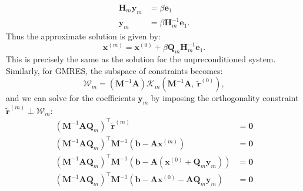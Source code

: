\documentclass{article}
\begin{document}
\begin{appendix}
\begin{align*}
        \symbf{H}_m \symbf{y}_m                                                                                                                                        & = \beta \symbf{e}_1                   \\
        \symbf{y}_m                                                                                                                                                    & = \beta \symbf{H}_m^{-1} \symbf{e}_1.
    \end{align*}
    Thus the approximate solution is given by:
    \begin{equation*}
        \symbf{x}^{\left( m \right)} = \symbf{x}^{\left( 0 \right)} + \beta \symbf{Q}_m \symbf{H}_m^{-1} \symbf{e}_1.
    \end{equation*}
    This is precisely the same as the solution for the unpreconditioned
    system. Similarly, for GMRES, the subspace of constraints becomes:
    \begin{equation*}
        \mathcal{W}_m = \left( \symbf{M}^{-1} \symbf{A} \right) \mathcal{K}_m\left( \symbf{M}^{-1} \symbf{A},\: \tilde{\symbf{r}}^{\left( 0 \right)} \right),
    \end{equation*}
    and we can solve for the coefficients \(\symbf{y}_m\) by imposing the
    orthogonality constraint \(\tilde{\symbf{r}}^{\left( m \right)} \perp \mathcal{W}_m\):
    \begin{align*}
        \left( \symbf{M}^{-1} \symbf{A} \symbf{Q}_m \right)^\top \tilde{\symbf{r}}^{\left( m \right)}                                                                                                     & = \symbf{0}                                                                                             \\
        \left( \symbf{M}^{-1} \symbf{A} \symbf{Q}_m \right)^\top \symbf{M}^{-1} \left( \symbf{b} - \symbf{A} \symbf{x}^{\left( m \right)} \right)                                                         & = \symbf{0}                                                                                             \\
        \left( \symbf{M}^{-1} \symbf{A} \symbf{Q}_m \right)^\top \symbf{M}^{-1} \left( \symbf{b} - \symbf{A} \left( \symbf{x}^{\left( 0 \right)} + \symbf{Q}_m \symbf{y}_m \right) \right)                & = \symbf{0}                                                                                             \\
        \left( \symbf{M}^{-1} \symbf{A} \symbf{Q}_m \right)^\top \symbf{M}^{-1} \left( \symbf{b} - \symbf{A} \symbf{x}^{\left( 0 \right)} - \symbf{A} \symbf{Q}_m \symbf{y}_m \right)                     & = \symbf{0}                                                                                             \\

\end{align*}
\end{appendix}
\end{document}
